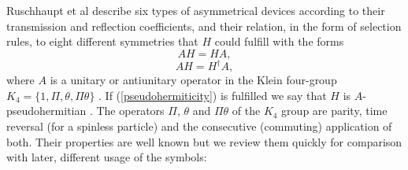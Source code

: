 %
%
Ruschhaupt et al \cite{Ruschhaupt2017} describe  six types of  asymmetrical devices according to their transmission and reflection coefficients, and their relation,  in the form of selection rules,  to eight different symmetries that $H$ could fulfill
with the forms
%
\begin{equation}
AH=HA, \label{commutation}
\end{equation}
%
\begin{equation}
AH=H^{\dagger}A, \label{pseudohermiticity}
\end{equation}
%
%
where $A$ is a unitary or antiunitary operator in the Klein four-group \linebreak $K_{4}=\lbrace 1,\Pi,\theta,\Pi\theta \rbrace$ \cite{Ruschhaupt2017}.
If (\ref{pseudohermiticity})  is fulfilled we say that $H$ is $A$-pseudohermitian \cite{Mostafazadeh2010,Ruschhaupt2017}.
The operators $\Pi$, $\theta$ and $\Pi\theta$ of the $K_{4}$ group are parity, time reversal (for a spinless particle) and the consecutive (commuting) application of both. Their properties are well known but we review them quickly for comparison with later,  different
usage of the symbols:

